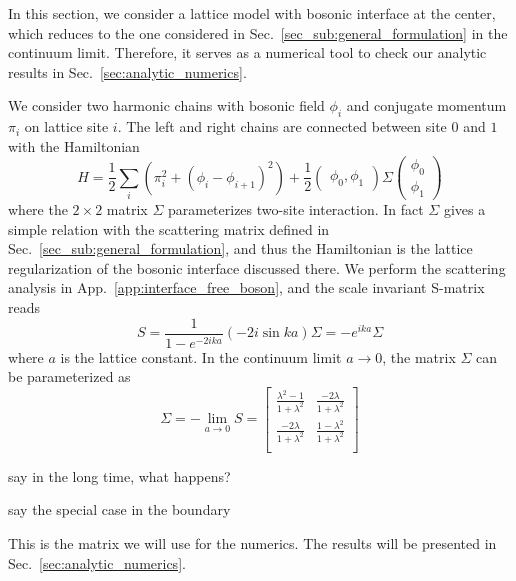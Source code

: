 
In this section, we consider a lattice model with bosonic interface at the center\cite{peschel_exact_2012,calabrese_entanglement_2012}, which reduces to the one considered in Sec.~\ref{sec_sub:general_formulation} in the continuum limit\cite{sakai_entanglement_2008}. Therefore, it serves as a numerical tool to check our analytic results in Sec.~\ref{sec:analytic_numerics}. 


We consider two harmonic chains with bosonic field $\phi_i$ and conjugate momentum $\pi_i$ on lattice site $i$. The left and right chains are connected between site $0$ and $1$ with the Hamiltonian
\begin{equation}
H = \frac{1}{2} \sum_i \left(\pi_i^2  + ( \phi_i - \phi_{i+1} )^2 \right) +  \frac{1}{2} \begin{pmatrix}  \phi_0, \phi_1 \end{pmatrix}
\Sigma
\begin{pmatrix}
\phi_0 \\
\phi_1 
\end{pmatrix}
\end{equation}
where the $2\times2$ matrix $\Sigma$ parameterizes two-site interaction. In fact $\Sigma$ gives a simple relation with the scattering matrix defined in Sec.~\ref{sec_sub:general_formulation}, and thus the Hamiltonian is the lattice regularization of the bosonic interface discussed there. We perform the scattering analysis in App.~\ref{app:interface_free_boson}, and the scale invariant S-matrix reads
\begin{equation}
S = \frac{1}{1 - e^{-2ika } } ( -2i \sin ka ) \Sigma
 = - e^{ika} \Sigma
\end{equation}
where $a$ is the lattice constant. In the continuum limit $a\rightarrow0$, the matrix $\Sigma$ can be parameterized as
\begin{equation}
\Sigma = -\lim_{a \rightarrow 0 } S = 
\begin{bmatrix}
\frac{\lambda^2- 1}{1 + \lambda^2} & \frac{-2\lambda }{1 + \lambda^2} \\
\frac{-2\lambda }{1 + \lambda^2} & \frac{1- \lambda^2}{1 + \lambda^2} \\
\end{bmatrix}
\end{equation}

{\bf\color{red}

say in the long time, what happens? 

say the special case in the boundary
}

This is the matrix we will use for the numerics. The results will be presented in Sec.~\ref{sec:analytic_numerics}.


